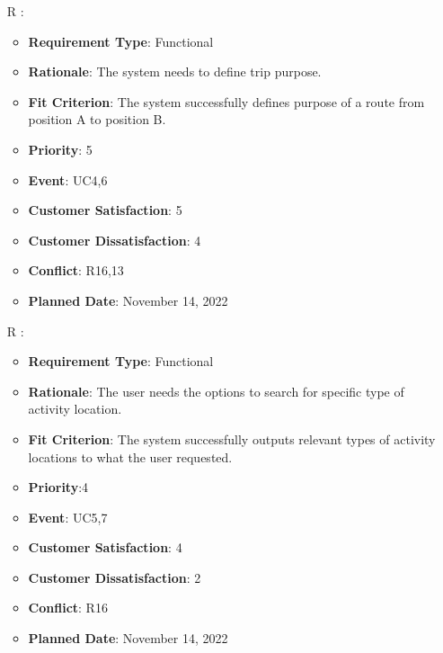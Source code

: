 \documentclass[12pt, titlepage]{article}
\newcounter{reqnum} %
\begin{document}
\begin{itemize}
\item[R\refstepcounter{reqnum}\thereqnum
\label{R_Inputs_1}:] 
\begin{itemize}
    \item \textbf{Requirement Type}: Functional
    \item \textbf{Rationale}: The system needs to define trip purpose.
    \item \textbf{Fit Criterion}: The system successfully defines purpose of a route from position A to position B.
    \item \textbf{Priority}: 5
    \item \textbf{Event}: UC4,6
    \item \textbf{Customer Satisfaction}: 5
    \item \textbf{Customer Dissatisfaction}: 4
    \item \textbf{Conflict}: R16,13
    \item \textbf{Planned Date}: November 14, 2022
\end{itemize}

\item[R\refstepcounter{reqnum}\thereqnum
\label{R_Inputs_1}:] 
\begin{itemize}
    \item \textbf{Requirement Type}: Functional
    \item \textbf{Rationale}: The user needs the options to search for specific type of activity location.
    \item \textbf{Fit Criterion}: The system successfully outputs relevant types of activity locations to what the user requested. 
    \item \textbf{Priority}:4
    \item \textbf{Event}: UC5,7
    \item \textbf{Customer Satisfaction}: 4
    \item \textbf{Customer Dissatisfaction}: 2
    \item \textbf{Conflict}: R16
    \item \textbf{Planned Date}: November 14, 2022
\end{itemize}


\end{itemize}
\end{document}
